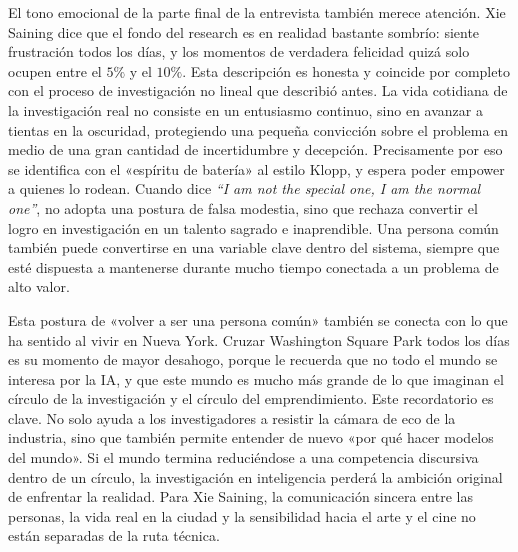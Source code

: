 \documentclass[a4paper,12pt]{article}
\begin{document}
El tono emocional de la parte final de la entrevista también merece atención. Xie Saining dice que el fondo del research es en realidad bastante sombrío: siente frustración todos los días, y los momentos de verdadera felicidad quizá solo ocupen entre el \(5\%\) y el \(10\%\). Esta descripción es honesta y coincide por completo con el proceso de investigación no lineal que describió antes. La vida cotidiana de la investigación real no consiste en un entusiasmo continuo, sino en avanzar a tientas en la oscuridad, protegiendo una pequeña convicción sobre el problema en medio de una gran cantidad de incertidumbre y decepción. Precisamente por eso se identifica con el «espíritu de batería» al estilo Klopp, y espera poder empower a quienes lo rodean. Cuando dice \textit{``I am not the special one, I am the normal one''}, no adopta una postura de falsa modestia, sino que rechaza convertir el logro en investigación en un talento sagrado e inaprendible. Una persona común también puede convertirse en una variable clave dentro del sistema, siempre que esté dispuesta a mantenerse durante mucho tiempo conectada a un problema de alto valor.

Esta postura de «volver a ser una persona común» también se conecta con lo que ha sentido al vivir en Nueva York. Cruzar Washington Square Park todos los días es su momento de mayor desahogo, porque le recuerda que no todo el mundo se interesa por la IA, y que este mundo es mucho más grande de lo que imaginan el círculo de la investigación y el círculo del emprendimiento. Este recordatorio es clave. No solo ayuda a los investigadores a resistir la cámara de eco de la industria, sino que también permite entender de nuevo «por qué hacer modelos del mundo». Si el mundo termina reduciéndose a una competencia discursiva dentro de un círculo, la investigación en inteligencia perderá la ambición original de enfrentar la realidad. Para Xie Saining, la comunicación sincera entre las personas, la vida real en la ciudad y la sensibilidad hacia el arte y el cine no están separadas de la ruta técnica.
\end{document}

